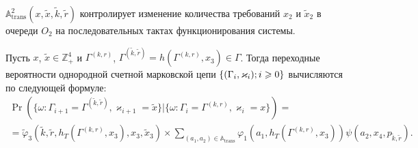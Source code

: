 ${\mathbb A}_{\mathrm{trans}}^2(x,  \tilde{x},  \tilde{k},  \tilde{r})$ контролирует изменение количества требований $x_2$ и $\tilde{x}_2$ в очереди $O_2$ на последовательных тактах функционирования системы.
\begin{theorem}
Пусть $x$,   $\tilde{x}\in \mathbb{Z}_+^4$ и $\Gamma^{(k,  r)}$,   $\Gamma^{(\tilde{k},  \tilde{r})}=h(\Gamma^{(k,  r)},  x_3) \in \Gamma$. Тогда переходные вероятности однородной счетной марковской цепи $\Mark$ вычисляются по следующей формуле:
\begin{multline}
\Pr (\{\omega\colon \Gamma_{i+1}=\Gamma^{(\tilde{k},  \tilde{r})},  \varkappa_{i+1}=\tilde{x} \}| \{\omega\colon \Gamma_{i}=\Gamma^{(k,  r)},  \varkappa_i=x\})=\\ 
=\widetilde{\varphi}_3(\tilde{k},  \tilde{r},  h_T(\Gamma^{(k,  r)},  x_3),  x_3,  \tilde{x}_3)\times
\sum_{(a_1,  a_2)\in {\mathbb A}_{\mathrm{trans}}}\varphi_1(a_1,  h_T(\Gamma^{(k,  r)},  x_3))  \psi(a_2,  x_4,   p_{\tilde{k},  \tilde{r}}).
\label{transitionToProve}
\end{multline}
\end{theorem}
